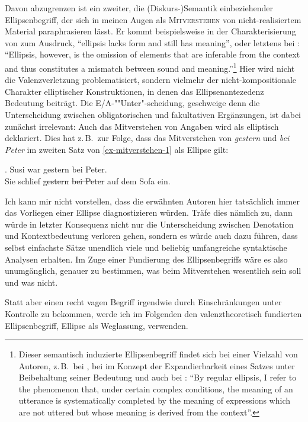 Davon abzugrenzen ist ein zweiter, die (Diskurs-)Semantik einbeziehender Ellipsenbegriff, der sich in meinen Augen als \textsc{Mitverstehen} von nicht-realisiertem Material paraphrasieren lässt. Er kommt beispielsweise in der Charakterisierung von \citet[1]{Winkler:Schwabe:03} zum Ausdruck, "`ellipsis lacks form and still has meaning"', oder letztens bei \citet[1]{Aelbrecht:10}: "`Ellipsis, however, is the omission of elements that are inferable from the context and thus constitutes a mismatch between sound and meaning."'\footnote{Dieser semantisch induzierte Ellipsenbegriff findet sich bei einer Vielzahl von Autoren, z.\,B.\  bei \citet[175]{Lyons:68}, bei \cite{Kindt:85} im Konzept der Expandierbarkeit eines Satzes unter Beibehaltung seiner Bedeutung und auch bei \citet[52]{Klein:81}: "`By regular ellipsis, I refer to the phenomenon that, under certain complex conditions, the meaning of an utterance is systematically completed by the meaning of expressions which are not uttered but whose meaning is derived from the context"'.} Hier wird nicht die Valenzverletzung problematisiert, sondern vielmehr der nicht-kompositionale Charakter elliptischer Konstruktionen, in denen das Ellipsenantezedenz Bedeutung beiträgt. Die E/A-""Unter"-scheidung, geschweige denn die Unterscheidung zwischen obligatorischen und fakultativen Ergänzungen, ist dabei zunächst irrelevant: Auch das Mitverstehen von Angaben wird als elliptisch deklariert. Dies hat z.\,B.\  zur Folge, dass das Mitverstehen von {\it gestern} und {\it bei Peter} im zweiten Satz von \ref{ex-mitverstehen-1} als Ellipse gilt: 

\ex. \label{ex-mitverstehen-1}Susi war gestern bei Peter. \\ Sie schlief \sout{gestern} \sout{bei Peter} auf dem Sofa ein.

Ich kann mir nicht vorstellen, dass die erwähnten Autoren hier tatsächlich immer das Vorliegen einer Ellipse diagnostizieren würden. Träfe dies nämlich zu, dann würde in letzter Konsequenz nicht nur die Unterscheidung zwischen Denotation und Kontextbedeutung verloren gehen, sondern es würde auch dazu führen, dass selbst einfachste Sätze unendlich viele und beliebig umfangreiche syntaktische Analysen erhalten. Im Zuge einer Fundierung des Ellipsenbegriffs wäre es also unumgänglich, genauer zu bestimmen, was beim Mitverstehen wesentlich sein soll und was nicht.

Statt aber einen recht vagen Begriff irgendwie durch Einschränkungen unter Kontrolle zu bekommen, werde ich im Folgenden den valenztheoretisch fundierten Ellipsenbegriff, Ellipse als Weglassung, verwenden.



